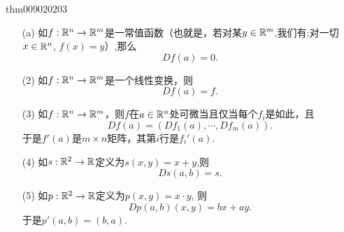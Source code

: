 \begin{theorem}{}{thm009020203}
\begin{enumerate}
\item[(a)] 如$f:\mathbb{R}^n \to \mathbb{R}^m$是一常值函数（也就是，若对某$y \in \mathbb{R}^m$,我们有:对一切$x \in \mathbb{R}^n$, $f(x) = y$）,那么
\[
Df(a) = 0.
\]

\item[(2)] 如$f:\mathbb{R}^n \to \mathbb{R}^m$是一个线性变换，则
\[
Df(a) = f.
\]

\item[(3)] 如$f:\mathbb{R}^n \to \mathbb{R}^m$，则$f$在$a \in \mathbb{R}^n$处可微当且仅当每个$f_i$是如此，且
\[
Df(a) = (Df_1(a), \cdots, Df_m(a)).
\]
于是$f'(a)$是$m \times n$矩阵，其第$i$行是$f_i'(a)$.

\item[(4)]如$s:\mathbb{R}^2 \to \mathbb{R}$定义为$s(x, y) = x + y$,则
\[
Ds(a, b) = s.
\]

\item[(5)]如$p:\mathbb{R}^2 \to \mathbb{R}$定义为$p(x, y) = x \cdot y$, 则
\[
Dp(a, b)(x, y) = bx + ay.
\]
于是$p'(a,b) = (b, a)$.
\end{enumerate}
\end{theorem}


